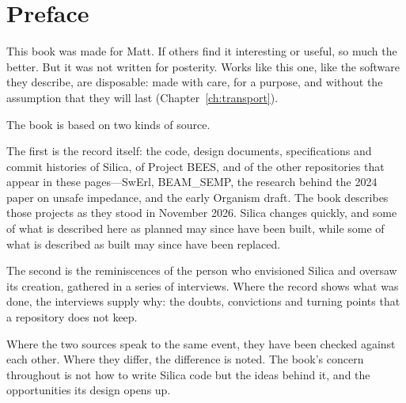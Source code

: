 \chapter{Preface}

This book was made for Matt. If others find it interesting or useful, so much
the better. But it was not written for posterity. Works like this one, like the
software they describe, are disposable: made with care, for a purpose, and
without the assumption that they will last (Chapter~\ref{ch:transport}).

The book is based on two kinds of source.

The first is the record itself: the code, design documents, specifications and
commit histories of Silica, of Project BEES, and of the other repositories that
appear in these pages---SwErl, BEAM\_SEMP, the research behind the 2024 paper
on unsafe impedance, and the early Organism draft. The book describes those
projects as they stood in November 2026. Silica changes quickly, and some of
what is described here as planned may since have been built, while some of
what is described as built may since have been replaced.

The second is the reminiscences of the person who envisioned Silica and
oversaw its creation, gathered in a series of interviews. Where the record
shows what was done, the interviews supply why: the doubts, convictions and
turning points that a repository does not keep.

Where the two sources speak to the same event, they have been checked against
each other. Where they differ, the difference is noted. The book's concern
throughout is not how to write Silica code but the ideas behind it, and the
opportunities its design opens up.
